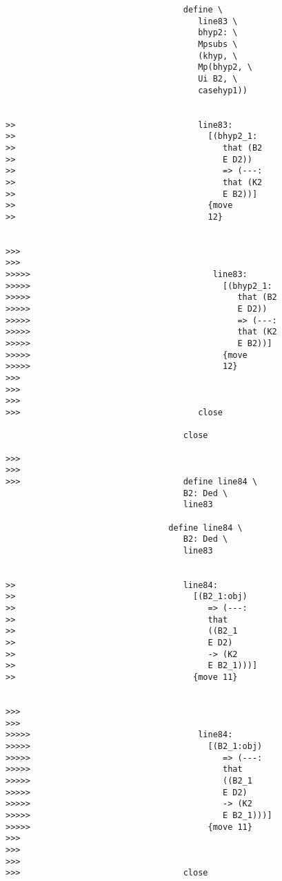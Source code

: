 \documentclass[12pt]{article}
\begin{document}
\begin{verbatim}
                                    define \
                                       line83 \
                                       bhyp2: \
                                       Mpsubs \
                                       (khyp, \
                                       Mp(bhyp2, \
                                       Ui B2, \
                                       casehyp1))


>>                                     line83:
>>                                       [(bhyp2_1:
>>                                          that (B2
>>                                          E D2))
>>                                          => (---:
>>                                          that (K2
>>                                          E B2))]
>>                                       {move
>>                                       12}


>>>
>>>
>>>>>                                     line83:
>>>>>                                       [(bhyp2_1:
>>>>>                                          that (B2
>>>>>                                          E D2))
>>>>>                                          => (---:
>>>>>                                          that (K2
>>>>>                                          E B2))]
>>>>>                                       {move
>>>>>                                       12}
>>>
>>>
>>>
>>>                                    close

                                    close

>>>
>>>
>>>                                 define line84 \
                                    B2: Ded \
                                    line83

                                 define line84 \
                                    B2: Ded \
                                    line83


>>                                  line84:
>>                                    [(B2_1:obj)
>>                                       => (---:
>>                                       that
>>                                       ((B2_1
>>                                       E D2)
>>                                       -> (K2
>>                                       E B2_1)))]
>>                                    {move 11}


>>>
>>>
>>>>>                                  line84:
>>>>>                                    [(B2_1:obj)
>>>>>                                       => (---:
>>>>>                                       that
>>>>>                                       ((B2_1
>>>>>                                       E D2)
>>>>>                                       -> (K2
>>>>>                                       E B2_1)))]
>>>>>                                    {move 11}
>>>
>>>
>>>
>>>                                 close


\end{verbatim}
\end{document}
